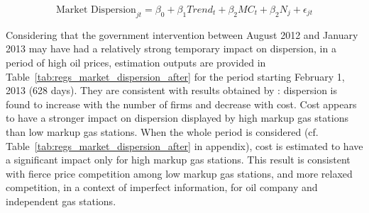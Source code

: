 \documentclass[english]{article}
\begin{document}
\begin{equation}
\text{Market Dispersion}_{jt}= \beta_0 + \beta_1 Trend_t + \beta_2 MC_t + \beta_2 N_j + \epsilon_{jt}
\end{equation}

Considering that the government intervention between August 2012 and January 2013 may have had a relatively strong temporary impact on dispersion, in a period of high oil prices, estimation outputs are provided in Table~\ref{tab:regs_market_dispersion_after} for the period starting February 1, 2013 (628 days). They are consistent with results obtained by \cite{CHA11}: dispersion is found to increase with the number of firms and decrease with cost. Cost appears to have a stronger impact on dispersion displayed by high markup gas stations than low markup gas stations. When the whole period is considered (cf. Table~\ref{tab:regs_market_dispersion_after} in appendix), cost is estimated to have a significant impact only for high markup gas stations. This result is consistent with fierce price competition among low markup gas stations, and more relaxed competition, in a context of imperfect information, for oil company and independent gas stations.
\end{document}
